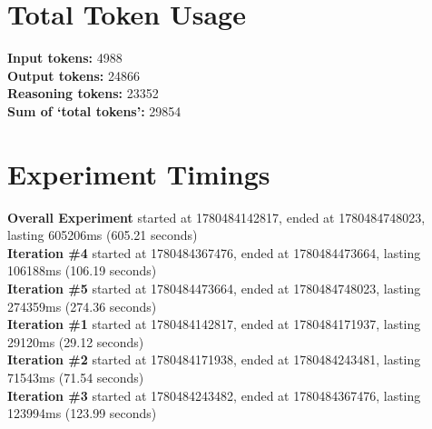\documentclass{article}
\begin{document}
\section*{Total Token Usage}
\textbf{Input tokens: }4988
\\\textbf{Output tokens: }24866
\\\textbf{Reasoning tokens: }23352
\\\textbf{Sum of `total tokens': }29854
\section*{Experiment Timings}
\textbf{Overall Experiment} started at 1780484142817, ended at 1780484748023, lasting 605206ms (605.21 seconds)
\\\textbf{Iteration \#4} started at 1780484367476, ended at 1780484473664, lasting 106188ms (106.19 seconds)
\\\textbf{Iteration \#5} started at 1780484473664, ended at 1780484748023, lasting 274359ms (274.36 seconds)
\\\textbf{Iteration \#1} started at 1780484142817, ended at 1780484171937, lasting 29120ms (29.12 seconds)
\\\textbf{Iteration \#2} started at 1780484171938, ended at 1780484243481, lasting 71543ms (71.54 seconds)
\\\textbf{Iteration \#3} started at 1780484243482, ended at 1780484367476, lasting 123994ms (123.99 seconds)
\end{document}
